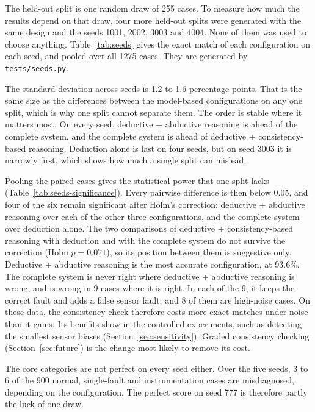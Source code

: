 The held-out split is one random draw of 255 cases. To measure how much the results depend on that draw, four more held-out splits were generated with the same design and the seeds 1001, 2002, 3003 and 4004. None of them was used to choose anything. Table~\ref{tab:seeds} gives the exact match of each configuration on each seed, and pooled over all 1275 cases. They are generated by \texttt{tests/seeds.py}.



The standard deviation across seeds is 1.2 to 1.6 percentage points. That is the same size as the differences between the model-based configurations on any one split, which is why one split cannot separate them. The order is stable where it matters most. On every seed, deductive + abductive reasoning is ahead of the complete system, and the complete system is ahead of deductive + consistency-based reasoning. Deduction alone is last on four seeds, but on seed 3003 it is narrowly first, which shows how much a single split can mislead.

Pooling the paired cases gives the statistical power that one split lacks (Table~\ref{tab:seeds-significance}). Every pairwise difference is then below 0.05, and four of the six remain significant after Holm's correction: deductive + abductive reasoning over each of the other three configurations, and the complete system over deduction alone. The two comparisons of deductive + consistency-based reasoning with deduction and with the complete system do not survive the correction (Holm $p = 0.071$), so its position between them is suggestive only. Deductive + abductive reasoning is the most accurate configuration, at 93.6\%. The complete system is never right where deductive + abductive reasoning is wrong, and is wrong in 9 cases where it is right. In each of the 9, it keeps the correct fault and adds a false sensor fault, and 8 of them are high-noise cases. On these data, the consistency check therefore costs more exact matches under noise than it gains. Its benefits show in the controlled experiments, such as detecting the smallest sensor biases (Section~\ref{sec:sensitivity}). Graded consistency checking (Section~\ref{sec:future}) is the change most likely to remove its cost.

The core categories are not perfect on every seed either. Over the five seeds, 3 to 6 of the 900 normal, single-fault and instrumentation cases are misdiagnosed, depending on the configuration. The perfect score on seed 777 is therefore partly the luck of one draw.

